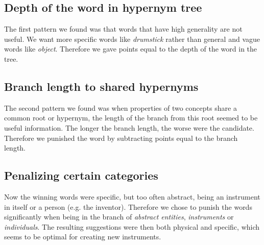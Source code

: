 \subsection{Depth of the word in hypernym tree}
The first pattern we found was that words that have high generality are not useful. We want more specific words like \emph{drumstick} rather than general and vague words like \emph{object}. Therefore we gave points equal to the depth of the word in the tree.
\subsection{Branch length to shared hypernyms}
The second pattern we found was when properties of two concepts share a common root or hypernym, the length of the branch from this root seemed to be useful information. The longer the branch length, the worse were the candidate. Therefore we punished the word by subtracting points equal to the branch length.
\subsection{Penalizing certain categories}
Now the winning words were specific, but too often abstract, being an instrument in itself or a person (e.g. the inventor). Therefore we chose to punish the words significantly when being in the branch of \emph{abstract entities}, \emph{instruments} or \emph{individuals}. The resulting suggestions were then both physical and specific, which seems to be optimal for creating new instruments.

